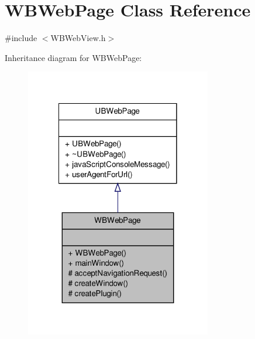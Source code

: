 \hypertarget{class_w_b_web_page}{\section{W\-B\-Web\-Page Class Reference}
\label{dd/dc8/class_w_b_web_page}
}


{\ttfamily \#include $<$W\-B\-Web\-View.\-h$>$}



Inheritance diagram for W\-B\-Web\-Page\-:
\nopagebreak
\begin{figure}[H]
\begin{center}
\leavevmode
\includegraphics[width=230pt]{d9/df3/class_w_b_web_page__inherit__graph}
\end{center}
\end{figure}


